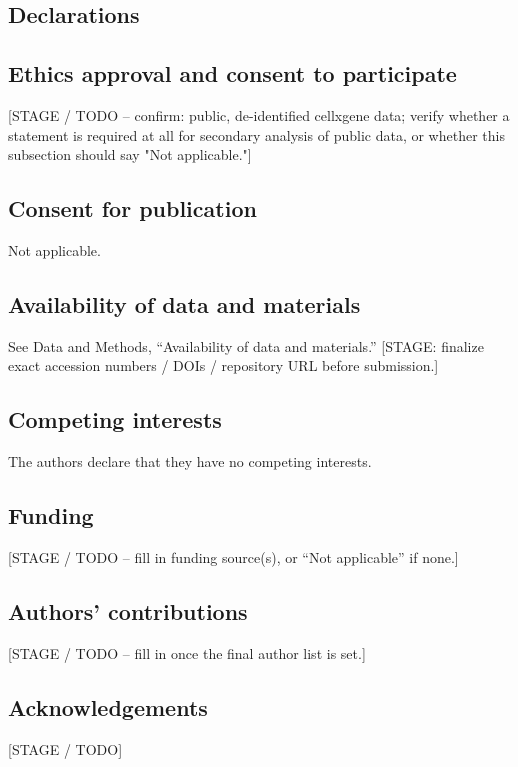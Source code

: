 \documentclass{bmcart}
\begin{document}
\begin{backmatter}

\section*{Declarations}

\subsection*{Ethics approval and consent to participate}
[STAGE / TODO -- confirm: public, de-identified cellxgene data; verify whether a
statement is required at all for secondary analysis of public data, or whether this
subsection should say "Not applicable."]

\subsection*{Consent for publication}
Not applicable.

\subsection*{Availability of data and materials}
See Data and Methods, ``Availability of data and materials.'' [STAGE: finalize exact accession
numbers / DOIs / repository URL before submission.]

\subsection*{Competing interests}
The authors declare that they have no competing interests.

\subsection*{Funding}
[STAGE / TODO -- fill in funding source(s), or ``Not applicable'' if none.]

\subsection*{Authors' contributions}
[STAGE / TODO -- fill in once the final author list is set.]

\subsection*{Acknowledgements}
[STAGE / TODO]




\end{backmatter}
\end{document}
